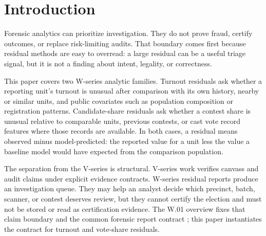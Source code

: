 \section{Introduction}

Forensic analytics can prioritize investigation. They do not prove fraud,
certify outcomes, or replace risk-limiting audits. That boundary comes first
because residual methods are easy to overread: a large residual can be a useful
triage signal, but it is not a finding about intent, legality, or correctness.

This paper covers two W-series analytic families. Turnout residuals ask whether
a reporting unit's turnout is unusual after comparison with its own history,
nearby or similar units, and public covariates such as population composition or
registration patterns. Candidate-share residuals ask whether a contest share is
unusual relative to comparable units, previous contests, or cast vote record
features where those records are available. In both cases, a residual means
observed minus model-predicted: the reported value for a unit less the value a
baseline model would have expected from the comparison population.

The separation from the V-series is structural. V-series work verifies canvass
and audit claims under explicit evidence contracts. W-series residual reports
produce an investigation queue. They may help an analyst decide which precinct,
batch, scanner, or contest deserves review, but they cannot certify the election
and must not be stored or read as certification evidence. The W.01 overview
fixes that claim boundary and the common forensic report contract
\citep{wseries-overview-2026}; this paper instantiates the contract for turnout
and vote-share residuals.
